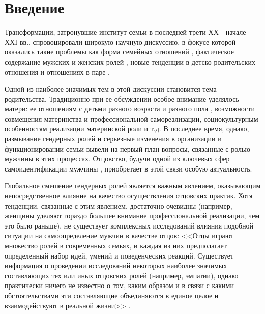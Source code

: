 \documentclass{../../common/thesisbyxetex}
\begin{document}
 \tableofcontents 

\chapter*{Введение} 

Трансформации, затронувшие институт семьи в последней трети ХХ - начале ХХI вв.,  спровоцировали
широкую научную дискуссию, в фокусе которой оказались такие проблемы как форма семейных
отношений \cite{gay, legfat}, фактическое содержание мужских и женских ролей \cite{mercoh, percep},
новые тенденции в детско-родительских отношения и отношениях в паре \cite{relot, sex}.

Одной из наиболее значимых тем в этой дискуссии становится тема родительства. Традиционно при ее
обсуждении особое внимание уделялось матери: ее отношениям с детьми разного возраста и разного
пола \cite{maler}, возможности совмещения материнства и профессиональной самореализации,
социокультурным особенностям реализации материнской роли и т.д. В последнее время, однако,
размывание гендерных ролей и серьезные изменения в организации и функционировании семьи
вывели на первый план вопросы, связанные с ролью мужчины в этих процессах. Отцовство, будучи одной
из ключевых сфер самоидентификации мужчины \cite{imaf}, приобретает в этой связи особую
актуальность.

Глобальное смешение гендерных ролей является  важным явлением, оказывающим
непосредственное влияние на качество осуществления отцовских практик. Хотя тенденции, связанные
с этим явлением, достаточно очевидны (например, женщины уделяют гораздо большее внимание
профессиональной реализации, чем это было раньше), не существует комплексных исследований
влияния подобной ситуации на самоопределение мужчин в качестве отцов: <<Отцы играют множество
ролей в современных семьях, и каждая из них предполагает определенный набор идей, умений и
поведенческих реакций. Существует информация о проведении исследований некоторых наиболее
значимых составляющих тех или иных отцовских ролей (например, эмпатии), однако
практически ничего не известно о том, каким образом и в связи с какими обстоятельствами эти
составляющие объединяются в единое целое и взаимодействуют в реальной жизни>>
 \cite[131]{f21}.

\end{document}
